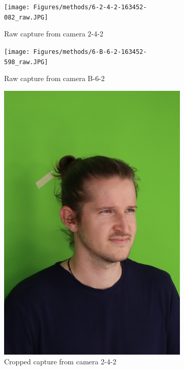 \begin{figure}[ht]
	\centering
	\begin{subfigure}{0.4\linewidth}
		\texttt{[image: Figures/methods/6-2-4-2-163452-082\_raw.JPG]}
		\caption{Raw capture from camera 2-4-2}
	\end{subfigure}
	\begin{subfigure}{0.4\linewidth}
		\texttt{[image: Figures/methods/6-B-6-2-163452-598\_raw.JPG]}
		\caption{Raw capture from camera B-6-2}
	\end{subfigure}
	\vfil
	\begin{subfigure}{0.4\linewidth}
		\includegraphics[width=\textwidth]{Figures/methods/6-2-4-2-163452-082_crop.JPG}
		\caption{Cropped capture from camera 2-4-2}
	\end{subfigure}
	\begin{subfigure}{0.4\linewidth}

\end{subfigure}
\end{figure}
